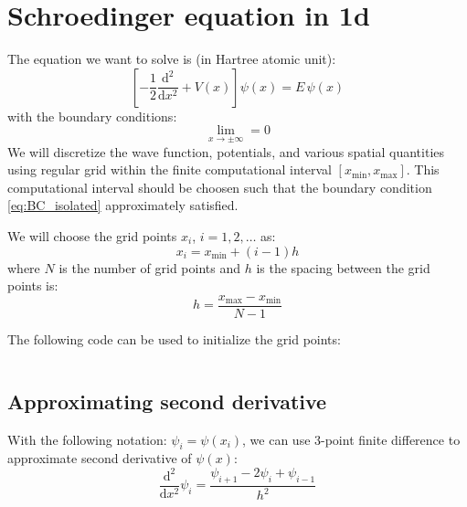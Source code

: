\chapter{Schroedinger equation in 1d}

The equation we want to solve is (in Hartree atomic unit):
\begin{equation}
\left[ -\frac{1}{2}\frac{\mathrm{d}^2}{\mathrm{d}x^2} + V(x) \right] \psi(x) = E\, \psi(x)
\end{equation}
with the boundary conditions:
\begin{equation}
\lim_{x \rightarrow \pm \infty} = 0
\label{eq:BC_isolated}
\end{equation}
%
We will discretize the wave function, potentials, and various spatial quantities using
regular grid within the finite computational interval
$\left[x_{\mathrm{min}}, x_{\mathrm{max}}\right]$. This computational interval should be choosen
such that the boundary condition \ref{eq:BC_isolated} approximately satisfied.

We will choose the grid points $x_{i}$, $i = 1, 2, \ldots$ as:
\begin{equation}
x_{i} = x_{\mathrm{min}} + (i-1)h
\end{equation}
where $N$ is the number of grid points and $h$ is the spacing between the grid points
is:
\begin{equation}
h = \frac{ x_{\mathrm{max}} - x_{\mathrm{min}} }{N-1}
\end{equation}

The following code can be used to initialize the grid points:

\inputminted[breaklines,fontsize=\scriptsize]{julia}{codes/1d/init_FD1d_grid.jl}


\section{Approximating second derivative}

With the following notation: $\psi_{i} = \psi(x_{i})$, we can use 3-point
finite difference to approximate second derivative of $\psi(x)$:
\begin{equation}
\frac{\mathrm{d}^2}{\mathrm{d}x^2} \psi_{i} =
\frac{\psi_{i+1} - 2\psi_{i} + \psi_{i-1}}{h^2}
\end{equation}


